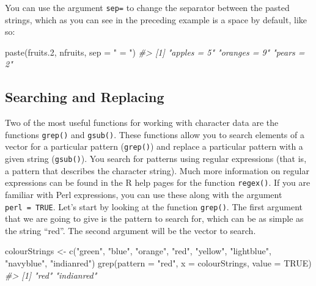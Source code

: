 \documentclass[
]{book}
\newenvironment{Shaded}{\begin{snugshade}}{\end{snugshade}}
\newcommand{\AttributeTok}[1]{\textcolor[rgb]{0.77,0.63,0.00}{#1}}
\newcommand{\CommentTok}[1]{\textcolor[rgb]{0.56,0.35,0.01}{\textit{#1}}}
\newcommand{\ConstantTok}[1]{\textcolor[rgb]{0.00,0.00,0.00}{#1}}
\newcommand{\FloatTok}[1]{\textcolor[rgb]{0.00,0.00,0.81}{#1}}
\newcommand{\FunctionTok}[1]{\textcolor[rgb]{0.00,0.00,0.00}{#1}}
\newcommand{\NormalTok}[1]{#1}
\newcommand{\OtherTok}[1]{\textcolor[rgb]{0.56,0.35,0.01}{#1}}
\newcommand{\StringTok}[1]{\textcolor[rgb]{0.31,0.60,0.02}{#1}}
\begin{document}
You can use the argument \texttt{sep=} to change the separator between the pasted strings, which as you can see in the preceding example is a space by default, like so:

\begin{Shaded}
\begin{Highlighting}[]
\FunctionTok{paste}\NormalTok{(fruits}\FloatTok{.2}\NormalTok{, nfruits, }\AttributeTok{sep =} \StringTok{" = "}\NormalTok{)}
\CommentTok{\#\textgreater{} [1] "apples = 5"  "oranges = 9" "pears = 2"}
\end{Highlighting}
\end{Shaded}

\hypertarget{searching-and-replacing}{%
\subsection{Searching and Replacing}\label{searching-and-replacing}}

Two of the most useful functions for working with character data are the functions \texttt{grep()} and \texttt{gsub()}. These functions allow you to search elements of a vector for a particular pattern (\texttt{grep()}) and replace a particular pattern with a given string (\texttt{gsub()}). You search for patterns using regular expressions (that is, a pattern that describes the character string). Much more information on regular expressions can be found in the R help pages for the function \texttt{regex()}. If you are familiar with Perl expressions, you can use these along with the argument \texttt{perl\ =\ TRUE}. Let's start by looking at the function \texttt{grep()}. The first argument that we are going to give is the pattern to search for, which can be as simple as the string ``red''. The second argument will be the vector to search.

\begin{Shaded}
\begin{Highlighting}[]
\NormalTok{colourStrings }\OtherTok{\textless{}{-}} \FunctionTok{c}\NormalTok{(}\StringTok{"green"}\NormalTok{, }\StringTok{"blue"}\NormalTok{, }\StringTok{"orange"}\NormalTok{, }\StringTok{"red"}\NormalTok{, }\StringTok{"yellow"}\NormalTok{, }\StringTok{"lightblue"}\NormalTok{, }\StringTok{"navyblue"}\NormalTok{, }\StringTok{"indianred"}\NormalTok{)}
\FunctionTok{grep}\NormalTok{(}\AttributeTok{pattern =} \StringTok{"red"}\NormalTok{, }\AttributeTok{x =}\NormalTok{ colourStrings, }\AttributeTok{value =} \ConstantTok{TRUE}\NormalTok{)}
\CommentTok{\#\textgreater{} [1] "red"       "indianred"}
\end{Highlighting}
\end{Shaded}
\end{document}
